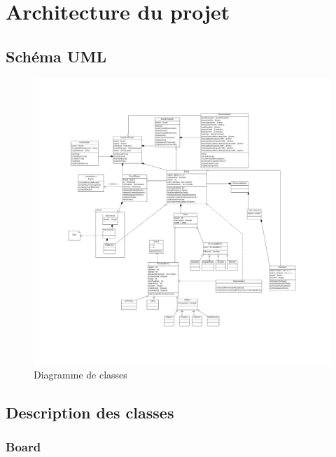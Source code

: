 \chapter{Architecture du projet}

	\section{Schéma UML}

		\begin{figure}[!h]
		    \caption{Diagramme de classes}
		    \centering
		    \includegraphics[width=\textwidth]{images/architecture/diagram.png}
		\end{figure}

		\clearpage

	\section{Description des classes}

		\subsection*{Board}
		
